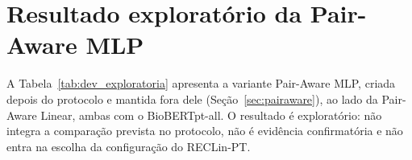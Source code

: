 \chapter[Resultado exploratório da Pair-Aware MLP]{Resultado exploratório da Pair-Aware MLP}
\label{ap:exploratoria}

A Tabela~\ref{tab:dev_exploratoria} apresenta a variante Pair-Aware MLP, criada
depois do protocolo e mantida fora dele (Seção~\ref{sec:pairaware}), ao lado da
Pair-Aware Linear, ambas com o BioBERTpt-all. O resultado é exploratório: não integra a comparação prevista no protocolo, não é evidência confirmatória e não entra na escolha da
configuração do RECLin-PT.


